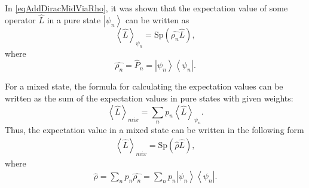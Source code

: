In \ref{eqAddDiracMidViaRho}, it was shown that the expectation value
of some operator \(\hat{L}\) in a pure state
\(\left|\psi_n\right>\) can be written as
\[
\left< \hat{L} \right>_{\psi_n} = \mathrm{Sp} \left(\hat{\rho_n} \hat{L} \right),
\]
where
\[
\hat{\rho_n} = \hat{P}_n = \left|\psi_n\right>\left<\psi_n\right|.
\]

For a mixed state, the formula for calculating the expectation values can be written
as the sum of the expectation values in pure states with given weights:
\[
\left< \hat{L} \right>_{mix} = \sum_n p_n \left< \hat{L}
\right>_{\psi_n}.
\]
Thus, the expectation value in a mixed state can be written in the following
form
\begin{eqnarray}
\left< \hat{L} \right>_{mix} = \mathrm{Sp} \left(\hat{\rho} \hat{L} \right),
\end{eqnarray}
where
\begin{eqnarray}
\hat{\rho} = \sum_n p_n \hat{\rho_n} = 
\sum_n p_n \left|\psi_n\right>\left<\psi_n\right|.
\end{eqnarray}